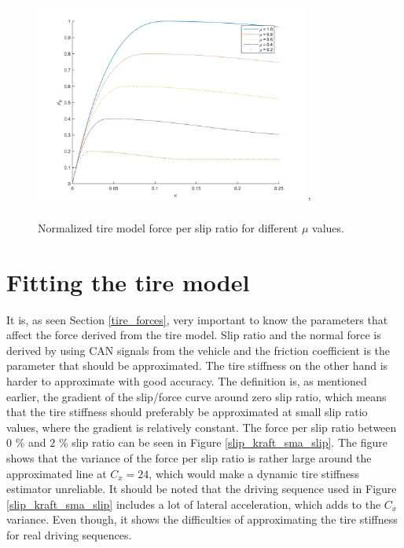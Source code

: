 \begin{figure}[h]
	\centering
	\includegraphics[width=0.8\textwidth]{Pictures/slipkraft_olika_mue}
	'\caption {Normalized tire model force per slip ratio for different $ \mu $ values.}
	\label{different_mue}
\end{figure}

\section{Fitting the tire model}
It is, as seen Section \ref{tire_forces}, very important to know the parameters that affect the force derived from the tire model. Slip ratio and the normal force is derived by using CAN signals from the vehicle and the friction coefficient is the parameter that should be approximated. The tire stiffness on the other hand is harder to approximate with good accuracy. The definition is, as mentioned earlier, the gradient of the slip/force curve around zero slip ratio, which means that the tire stiffness should preferably be approximated at small slip ratio values, where the gradient is relatively constant. The force per slip ratio between $ 0 $ \% and $ 2 $ \% slip ratio can be seen in Figure \ref{slip_kraft_sma_slip}. The figure shows that the variance of the force per slip ratio is rather large around the approximated line at $ C_{x} = 24 $, which would make a dynamic tire stiffness estimator unreliable. It should be noted that the driving sequence used in Figure \ref{slip_kraft_sma_slip} includes a lot of lateral acceleration, which adds to the $ C_{x} $ variance. Even though, it shows the difficulties of approximating the tire stiffness for real driving sequences. 

